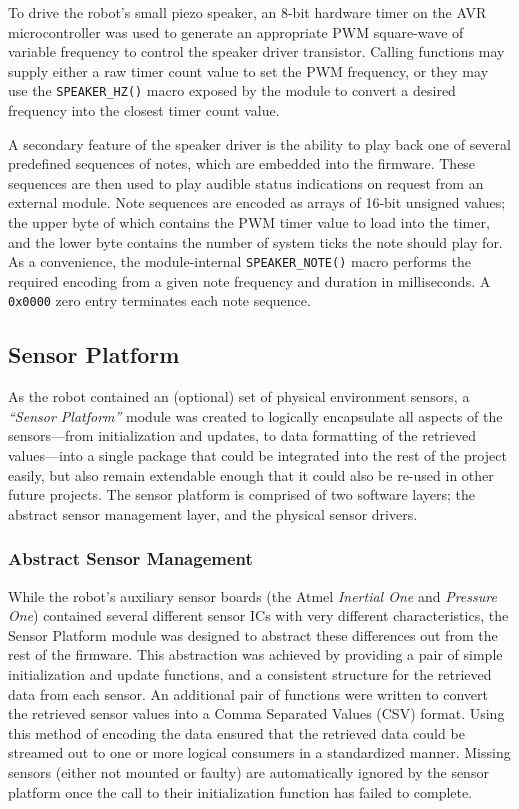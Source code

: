 To drive the robot's small piezo speaker, an 8-bit hardware timer on the AVR microcontroller was used to generate an appropriate PWM square-wave of variable frequency to control the speaker driver transistor. Calling functions may supply either a raw timer count value to set the PWM frequency, or they may use the \lstinline{SPEAKER_HZ()} macro exposed by the module to convert a desired frequency into the closest timer count value.

A secondary feature of the speaker driver is the ability to play back one of several predefined sequences of notes, which are embedded into the firmware. These sequences are then used to play audible status indications on request from an external module. Note sequences are encoded as arrays of 16-bit unsigned values; the upper byte of which contains the PWM timer value to load into the timer, and the lower byte contains the number of system ticks the note should play for. As a convenience, the module-internal \lstinline{SPEAKER_NOTE()} macro performs the required encoding from a given note frequency and duration in milliseconds. A \lstinline{0x0000} zero entry terminates each note sequence.

\FloatBarrier
\subsection{Sensor Platform}

As the robot contained an (optional) set of physical environment sensors, a \textit{``Sensor Platform''} module was created to logically encapsulate all aspects of the sensors---from initialization and updates, to data formatting of the retrieved values---into a single package that could be integrated into the rest of the project easily, but also remain extendable enough that it could also be re-used in other future projects. The sensor platform is comprised of two software layers; the abstract sensor management layer, and the physical sensor drivers.

\FloatBarrier
\subsubsection{Abstract Sensor Management}

While the robot's auxiliary sensor boards (the Atmel \textit{Inertial One} and \textit{Pressure One}) contained several different sensor ICs with very different characteristics, the Sensor Platform module was designed to abstract these differences out from the rest of the firmware. This abstraction was achieved by providing a pair of simple initialization and update functions, and a consistent structure for the retrieved data from each sensor. An additional pair of functions were written to convert the retrieved sensor values into a Comma Separated Values (CSV) format. Using this method of encoding the data ensured that the retrieved data could be streamed out to one or more logical consumers in a standardized manner. Missing sensors (either not mounted or faulty) are automatically ignored by the sensor platform once the call to their initialization function has failed to complete.

